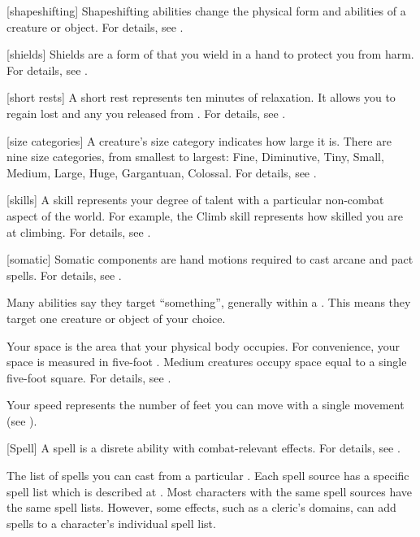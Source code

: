 [shapeshifting] Shapeshifting abilities change the physical form and abilities of a creature or object.
For details, see .

[shields] Shields are a form of  that you wield in a hand to protect you from harm.
For details, see .

[short rests] A short rest represents ten minutes of relaxation.
It allows you to regain lost  and any  you released from .
For details, see .

[size categories] A creature's size category indicates how large it is.
There are nine size categories, from smallest to largest: Fine, Diminutive, Tiny, Small, Medium, Large, Huge, Gargantuan, Colossal.
For details, see .

[skills] A skill represents your degree of talent with a particular non-combat aspect of the world.
For example, the Climb skill represents how skilled you are at climbing.
For details, see .

[somatic] Somatic components are hand motions required to cast arcane and pact spells.
For details, see .

 Many abilities say they target ``something'', generally within a .
This means they target one creature or object of your choice.

 Your space is the area that your physical body occupies.
For convenience, your space is measured in five-foot .
Medium creatures occupy space equal to a single five-foot square.
For details, see .

 Your speed represents the number of feet you can move with a single movement (see ).

[Spell] A spell is a disrete \magical ability with combat-relevant effects.
For details, see .

 The list of spells you can cast from a particular .
Each spell source has a specific spell list which is described at .
Most characters with the same spell sources have the same spell lists.
However, some effects, such as a cleric's domains, can add spells to a character's individual spell list.

